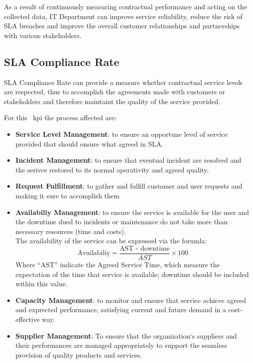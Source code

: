 As a result of continuously measuring contractual performance and acting on the collected data, IT Department can improve service reliability, reduce the risk of SLA breaches and improve the overall customer relationships and partnerships with various stakeholders.



\subsection{SLA Compliance Rate}
\label{sub:slaComplianceRate}

SLA Compliance Rate can provide a measure whether contractual service levels are respected, thus to accomplish the agreements made with customers or stakeholders and therefore maintaint the quality of the service provided.


For this ~\gls{kpi} the process affected are:
\begin{itemize}
    \item \textbf{Service Level Management}: to ensure an opportune level of service provided that should ensure what agreed in SLA.
    \item \textbf{Incident Management}: to ensure that eventual incident are resolved and the serivce restored to its normal operativity and agreed quality.
    \item \textbf{Request Fulfillment}: to gather and fulfill customer and user requests and making it sure to accomplish them
    \item \textbf{Availabiliy Management}: to ensure the service is available for the user and the downtime dued to incidents or maintenance do not take more than necessary resources (time and costs).\\ 
    The availability of the service can be expressed via the forumla: 
    \[
        \text{Availabiliy} = \frac{\text{AST - downtime}}{AST} \times 100
    \]
    Where ``AST'' indicate the Agreed Service Time, which measure the expectation of the time that service is available; downtime should be included within this value.
    \item \textbf{Capacity Management}: to monitor and ensure that service achieve agreed and exprected performance, satisfying current and future demand in a cost-eﬀective way.
    \item \textbf{Supplier Management}: To ensure that the organization`s suppliers and their performances are managed appropriately to support the seamless provision of quality products and services.
\end{itemize}


